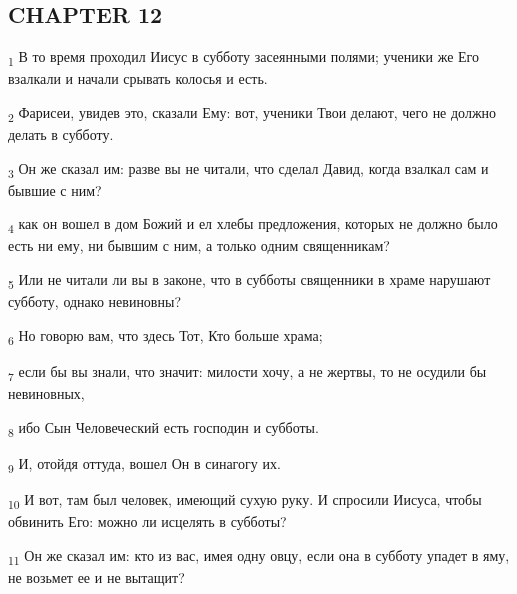 \subsection{CHAPTER 12}
\begin{tcolorbox}
\textsubscript{1} В то время проходил Иисус в субботу засеянными полями; ученики же Его взалкали и начали срывать колосья и есть.
\end{tcolorbox}
\begin{tcolorbox}
\textsubscript{2} Фарисеи, увидев это, сказали Ему: вот, ученики Твои делают, чего не должно делать в субботу.
\end{tcolorbox}
\begin{tcolorbox}
\textsubscript{3} Он же сказал им: разве вы не читали, что сделал Давид, когда взалкал сам и бывшие с ним?
\end{tcolorbox}
\begin{tcolorbox}
\textsubscript{4} как он вошел в дом Божий и ел хлебы предложения, которых не должно было есть ни ему, ни бывшим с ним, а только одним священникам?
\end{tcolorbox}
\begin{tcolorbox}
\textsubscript{5} Или не читали ли вы в законе, что в субботы священники в храме нарушают субботу, однако невиновны?
\end{tcolorbox}
\begin{tcolorbox}
\textsubscript{6} Но говорю вам, что здесь Тот, Кто больше храма;
\end{tcolorbox}
\begin{tcolorbox}
\textsubscript{7} если бы вы знали, что значит: милости хочу, а не жертвы, то не осудили бы невиновных,
\end{tcolorbox}
\begin{tcolorbox}
\textsubscript{8} ибо Сын Человеческий есть господин и субботы.
\end{tcolorbox}
\begin{tcolorbox}
\textsubscript{9} И, отойдя оттуда, вошел Он в синагогу их.
\end{tcolorbox}
\begin{tcolorbox}
\textsubscript{10} И вот, там был человек, имеющий сухую руку. И спросили Иисуса, чтобы обвинить Его: можно ли исцелять в субботы?
\end{tcolorbox}
\begin{tcolorbox}
\textsubscript{11} Он же сказал им: кто из вас, имея одну овцу, если она в субботу упадет в яму, не возьмет ее и не вытащит?
\end{tcolorbox}
